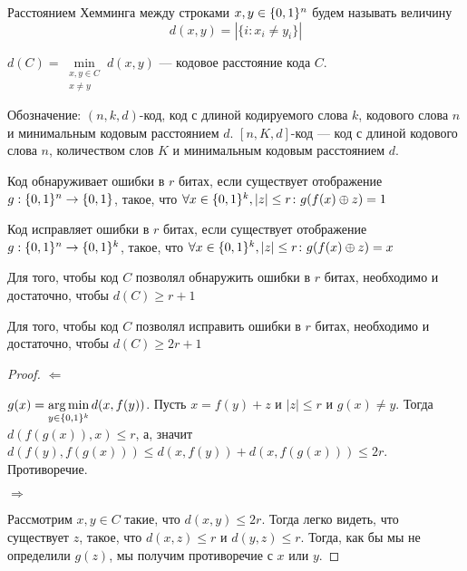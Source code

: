 \begin{definition}
Расстоянием Хемминга между строками $x,y \in \{0,1\}^n$ будем называть величину
$$d(x,y) = |\{i \colon x_i \neq y_i\}|$$
\end{definition}

\begin{definition}
$d(C) = \min\limits_{\substack{x,y \in C \\ x \neq y}} d(x,y)$ --- кодовое
 расстояние кода $C$.
\end{definition}

Обозначение: $(n,k,d)$-код, код с длиной кодируемого слова $k$, кодового слова $n$
и минимальным кодовым расстоянием $d$. $[n,K,d]$-код --- код с длиной кодового слова
$n$, количеством слов $K$ и минимальным кодовым расстоянием $d$.

\begin{definition}
Код обнаруживает ошибки в $r$ битах, если существует отображение $g: \{0,1\}^n \to \{0,1\}$,
такое, что $\forall x \in \{0,1\}^k, |z| \le r \colon g(f(x) \oplus z) = 1$
\end{definition}

\begin{definition}
Код исправляет ошибки в $r$ битах, если существует отображение $g: \{0,1\}^n \to \{0,1\}^k$,
такое, что $\forall x \in \{0,1\}^k, |z| \le r \colon g(f(x) \oplus z) = x$
\end{definition}

\begin{theorem}
Для того, чтобы код $C$ позволял обнаружить ошибки в $r$ битах, необходимо
и достаточно, чтобы $d(C) \ge r+1$
\end{theorem}

\begin{theorem}
Для того, чтобы код $C$ позволял исправить ошибки в $r$ битах, необходимо
и достаточно, чтобы $d(C) \ge 2r+1$
\end{theorem}

\begin{proof}
$\Leftarrow$

$g(x) = \operatorname*{arg\,min}\limits_{y \in \{0,1\}^k} d(x, f(y))$. Пусть $x = f(y) + z$ и $|z| \le r$
и $g(x) \neq y$. Тогда $d(f(g(x)), x) \le r$, а, значит $d(f(y),f(g(x))) \le 
d(x, f(y)) + d(x, f(g(x))) \le 2r$. Противоречие.

$\Rightarrow$

Рассмотрим $x,y \in C$ такие, что $d(x,y) \le 2r$. Тогда легко видеть, что существует
$z$, такое, что $d(x,z) \le r$ и $d(y,z) \le r$. Тогда, как бы мы не определили 
$g(z)$, мы получим противоречие с $x$ или $y$.
\end{proof}

